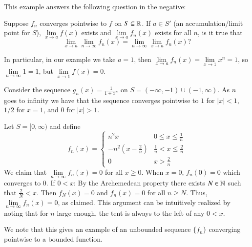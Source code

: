 This example answers the following question in the negative:

\begin{qst}
    Suppose $f_n$ converges pointwise to $f$ on $S \subseteq \mathbb R$. If $a \in S'$ (an accumulation/limit point for $S$), $\lim\limits_{x\rightarrow a}f(x)$ exists and $\lim\limits_{x\rightarrow a}f_n(x)$ exists for all $n$, is it true that \begin{equation*}
        \lim\limits_{x\rightarrow a}\lim\limits_{n\rightarrow \infty}f_n(x) = \lim\limits_{n\rightarrow \infty}\lim\limits_{x\rightarrow a}f_n(x)?
    \end{equation*}
\end{qst}

In particular, in our example we take $a = 1$, then $\lim\limits_{x\rightarrow a}f_n(x) = \lim\limits_{x\rightarrow 1}x^n = 1$, so $\lim\limits_{n\rightarrow \infty}1 = 1$, but $\lim\limits_{x\rightarrow 1}f(x) = 0$.


\begin{eg}
    Consider the sequence $g_n(x) = \frac{1}{1+x^n}$ on $S = (-\infty,-1)\cup(-1,\infty)$. As $n$ goes to infinity we have that the sequence converges pointwise to $1$ for $|x| < 1$, $1/2$ for $x = 1$, and $0$ for $|x| > 1$.
\end{eg}

\begin{eg}
    Let $S = [0,\infty)$ and define \begin{equation*}
        f_n(x) = \left\{\begin{array}{lc} n^2x & 0 \leq x \leq \frac{1}{n} \\ -n^2\left(x-\frac{2}{n}\right) & \frac{1}{n} < x \leq \frac{2}{n} \\ 0 & x > \frac{2}{n}\end{array}\right.
    \end{equation*}
    We claim that $\lim\limits_{n\rightarrow \infty}f_n(x) = 0$ for all $x \geq 0$. When $x=0$, $f_n(0) = 0$ which converges to $0$. If $0 < x$: By the Archemedean property there exists $N \in \mathbb N$ such that $\frac{2}{N} < x$. Then $f_N(x) = 0$ and $f_n(x) = 0$ for all $n \geq N$. Thus, $\lim\limits_{n\rightarrow \infty}f_n(x) = 0$, as claimed. This argument can be intuitively realized by noting that for $n$ large enough, the tent is always to the left of any $0 < x$.
\end{eg}

We note that this gives an example of an unbounded sequence $\{f_n\}$ converging pointwise to a bounded function.

